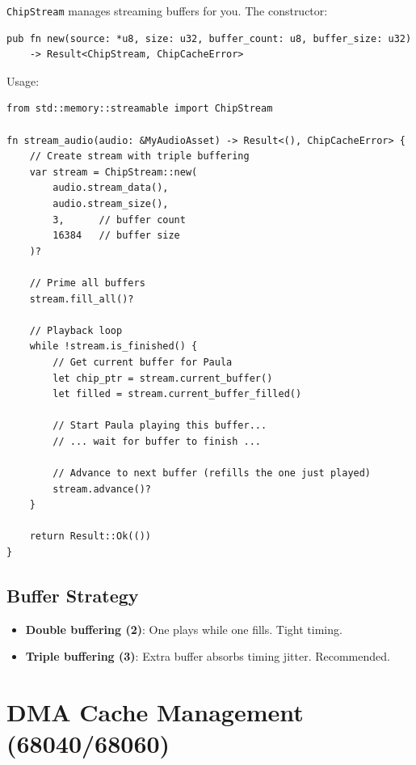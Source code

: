 \texttt{ChipStream} manages streaming buffers for you. The constructor:

\begin{lstlisting}
pub fn new(source: *u8, size: u32, buffer_count: u8, buffer_size: u32)
    -> Result<ChipStream, ChipCacheError>
\end{lstlisting}

Usage:

\begin{lstlisting}
from std::memory::streamable import ChipStream

fn stream_audio(audio: &MyAudioAsset) -> Result<(), ChipCacheError> {
    // Create stream with triple buffering
    var stream = ChipStream::new(
        audio.stream_data(),
        audio.stream_size(),
        3,      // buffer count
        16384   // buffer size
    )?

    // Prime all buffers
    stream.fill_all()?

    // Playback loop
    while !stream.is_finished() {
        // Get current buffer for Paula
        let chip_ptr = stream.current_buffer()
        let filled = stream.current_buffer_filled()

        // Start Paula playing this buffer...
        // ... wait for buffer to finish ...

        // Advance to next buffer (refills the one just played)
        stream.advance()?
    }

    return Result::Ok(())
}
\end{lstlisting}

\subsection{Buffer Strategy}

\begin{itemize}
    \item \textbf{Double buffering (2)}: One plays while one fills. Tight timing.
    \item \textbf{Triple buffering (3)}: Extra buffer absorbs timing jitter. Recommended.
\end{itemize}

\section{DMA Cache Management (68040/68060)}
\label{sec:dma-cache}

